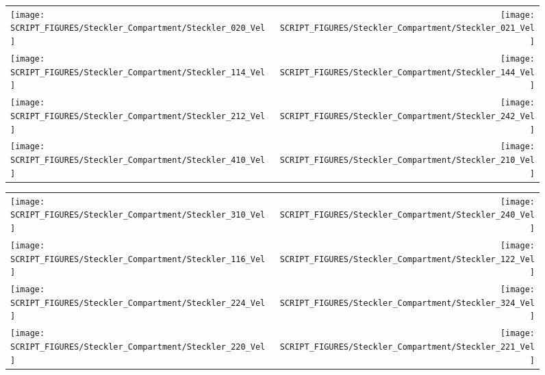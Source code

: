\begin{figure}[p]
\begin{tabular*}{\textwidth}{l@{\extracolsep{\fill}}r}
\texttt{[image: SCRIPT\_FIGURES/Steckler\_Compartment/Steckler\_020\_Vel]} &
\texttt{[image: SCRIPT\_FIGURES/Steckler\_Compartment/Steckler\_021\_Vel]} \\
\texttt{[image: SCRIPT\_FIGURES/Steckler\_Compartment/Steckler\_114\_Vel]} &
\texttt{[image: SCRIPT\_FIGURES/Steckler\_Compartment/Steckler\_144\_Vel]} \\
\texttt{[image: SCRIPT\_FIGURES/Steckler\_Compartment/Steckler\_212\_Vel]} &
\texttt{[image: SCRIPT\_FIGURES/Steckler\_Compartment/Steckler\_242\_Vel]} \\
\texttt{[image: SCRIPT\_FIGURES/Steckler\_Compartment/Steckler\_410\_Vel]} &
\texttt{[image: SCRIPT\_FIGURES/Steckler\_Compartment/Steckler\_210\_Vel]}
\end{tabular*}
\label{Steckler_Vel_3}
\end{figure}

\begin{figure}[p]
\begin{tabular*}{\textwidth}{l@{\extracolsep{\fill}}r}
\texttt{[image: SCRIPT\_FIGURES/Steckler\_Compartment/Steckler\_310\_Vel]} &
\texttt{[image: SCRIPT\_FIGURES/Steckler\_Compartment/Steckler\_240\_Vel]} \\
\texttt{[image: SCRIPT\_FIGURES/Steckler\_Compartment/Steckler\_116\_Vel]} &
\texttt{[image: SCRIPT\_FIGURES/Steckler\_Compartment/Steckler\_122\_Vel]} \\
\texttt{[image: SCRIPT\_FIGURES/Steckler\_Compartment/Steckler\_224\_Vel]} &
\texttt{[image: SCRIPT\_FIGURES/Steckler\_Compartment/Steckler\_324\_Vel]} \\
\texttt{[image: SCRIPT\_FIGURES/Steckler\_Compartment/Steckler\_220\_Vel]} &
\texttt{[image: SCRIPT\_FIGURES/Steckler\_Compartment/Steckler\_221\_Vel]}
\end{tabular*}
\label{Steckler_Vel_4}
\end{figure}

